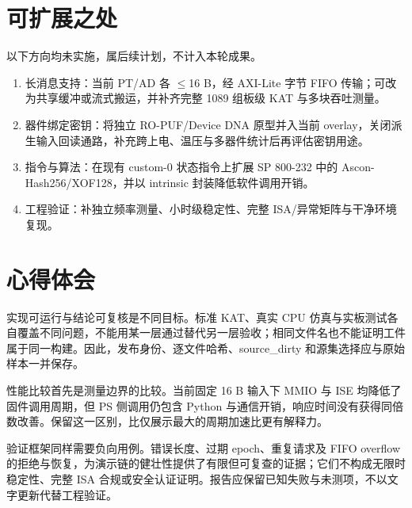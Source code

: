 
\Needspace{85pt}

\section{可扩展之处}

以下方向均未实施，属后续计划，不计入本轮成果。

\begin{enumerate}
\def\labelenumi{\arabic{enumi}.}
\tightlist
\item
  长消息支持：当前 PT/AD 各 $\leq$16 B，经 AXI-Lite 字节 FIFO 传输；可改为共享缓冲或流式搬运，并补齐完整 1089 组板级 KAT 与多块吞吐测量。
\item
  器件绑定密钥：将独立 RO-PUF/Device DNA 原型并入当前 overlay，关闭派生输入回读通路，补充跨上电、温压与多器件统计后再评估密钥用途。
\item
  指令与算法：在现有 custom-0 状态指令上扩展 SP 800-232 中的 Ascon-Hash256/XOF128，并以 intrinsic 封装降低软件调用开销。
\item
  工程验证：补独立频率测量、小时级稳定性、完整 ISA/异常矩阵与干净环境复现。
\end{enumerate}

\Needspace{85pt}

\section{心得体会}

实现可运行与结论可复核是不同目标。标准 KAT、真实 CPU 仿真与实板测试各自覆盖不同问题，不能用某一层通过替代另一层验收；相同文件名也不能证明工件属于同一构建。因此，发布身份、逐文件哈希、source\_dirty 和源集选择应与原始样本一并保存。

性能比较首先是测量边界的比较。当前固定 16 B 输入下 MMIO 与 ISE 均降低了固件调用周期，但 PS 侧调用仍包含 Python 与通信开销，响应时间没有获得同倍数改善。保留这一区别，比仅展示最大的周期加速比更有解释力。

验证框架同样需要负向用例。错误长度、过期 epoch、重复请求及 FIFO overflow 的拒绝与恢复，为演示链的健壮性提供了有限但可复查的证据；它们不构成无限时稳定性、完整 ISA 合规或安全认证证明。报告应保留已知失败与未测项，不以文字更新代替工程验证。
